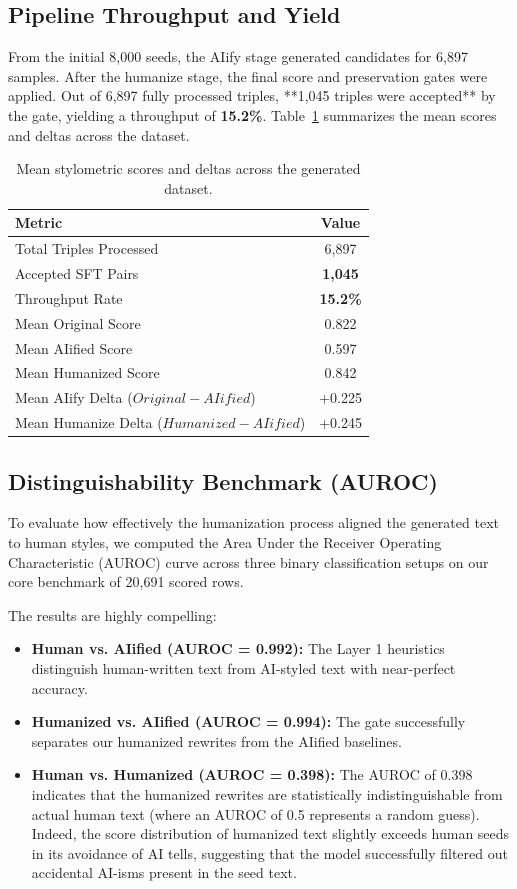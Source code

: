 \documentclass{article}
\begin{document}
\subsection{Pipeline Throughput and Yield}
From the initial 8,000 seeds, the AIify stage generated candidates for 6,897 samples. After the humanize stage, the final score and preservation gates were applied.
Out of 6,897 fully processed triples, **1,045 triples were accepted** by the gate, yielding a throughput of \textbf{15.2\%}. Table~\ref{tab:metrics} summarizes the mean scores and deltas across the dataset.

\begin{table}[htbp]
\centering
\caption{Mean stylometric scores and deltas across the generated dataset.}
\label{tab:metrics}
\begin{tabular}{lc}
\toprule
\textbf{Metric} & \textbf{Value} \\
\midrule
Total Triples Processed & 6,897 \\
Accepted SFT Pairs & \textbf{1,045} \\
Throughput Rate & \textbf{15.2\%} \\
\midrule
Mean Original Score & 0.822 \\
Mean AIified Score & 0.597 \\
Mean Humanized Score & 0.842 \\
\midrule
Mean AIify Delta ($Original - AIified$) & +0.225 \\
Mean Humanize Delta ($Humanized - AIified$) & +0.245 \\
\bottomrule
\end{tabular}
\end{table}

\subsection{Distinguishability Benchmark (AUROC)}
To evaluate how effectively the humanization process aligned the generated text to human styles, we computed the Area Under the Receiver Operating Characteristic (AUROC) curve across three binary classification setups on our core benchmark of 20,691 scored rows. 

The results are highly compelling:
\begin{itemize}
    \item \textbf{Human vs. AIified (AUROC = 0.992):} The Layer 1 heuristics distinguish human-written text from AI-styled text with near-perfect accuracy.
    \item \textbf{Humanized vs. AIified (AUROC = 0.994):} The gate successfully separates our humanized rewrites from the AIified baselines.
    \item \textbf{Human vs. Humanized (AUROC = 0.398):} The AUROC of 0.398 indicates that the humanized rewrites are statistically indistinguishable from actual human text (where an AUROC of 0.5 represents a random guess). Indeed, the score distribution of humanized text slightly exceeds human seeds in its avoidance of AI tells, suggesting that the model successfully filtered out accidental AI-isms present in the seed text.
\end{itemize}
\end{document}
